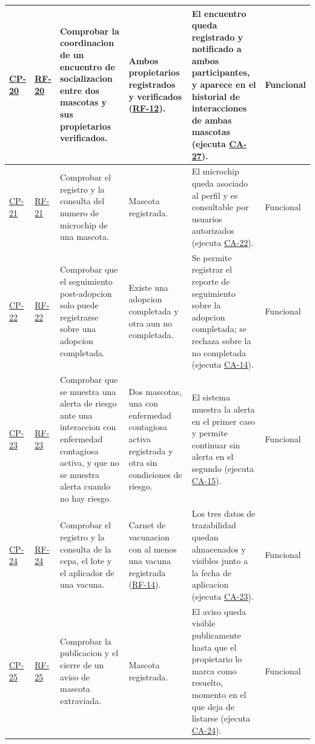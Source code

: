 \documentclass[journal,onecolumn]{IEEEtran}
\begin{document}
\begin{landscape}
\begin{longtable}{@{}p{1.3cm} p{1.3cm} p{4.6cm} p{3.6cm} p{5.2cm} p{1.6cm}@{}}
			\hyperref[cp:20]{CP-20}\label{cp:20} & \hyperref[tab:RF-20]{RF-20} & Comprobar la coordinacion de un encuentro de socializacion entre dos mascotas y sus propietarios verificados. & Ambos propietarios registrados y verificados (\hyperref[tab:RF-12]{RF-12}). & El encuentro queda registrado y notificado a ambos participantes, y aparece en el historial de interacciones de ambas mascotas (ejecuta \hyperref[lst:ca27]{CA-27}). & Funcional \\ \midrule
			\hyperref[cp:21]{CP-21}\label{cp:21} & \hyperref[tab:RF-21]{RF-21} & Comprobar el registro y la consulta del numero de microchip de una mascota. & Mascota registrada. & El microchip queda asociado al perfil y es consultable por usuarios autorizados (ejecuta \hyperref[lst:ca22]{CA-22}). & Funcional \\ \midrule
			\hyperref[cp:22]{CP-22}\label{cp:22} & \hyperref[tab:RF-22]{RF-22} & Comprobar que el seguimiento post-adopcion solo puede registrarse sobre una adopcion completada. & Existe una adopcion completada y otra aun no completada. & Se permite registrar el reporte de seguimiento sobre la adopcion completada; se rechaza sobre la no completada (ejecuta \hyperref[lst:ca14]{CA-14}). & Funcional \\ \midrule
			\hyperref[cp:23]{CP-23}\label{cp:23} & \hyperref[tab:RF-23]{RF-23} & Comprobar que se muestra una alerta de riesgo ante una interaccion con enfermedad contagiosa activa, y que no se muestra alerta cuando no hay riesgo. & Dos mascotas, una con enfermedad contagiosa activa registrada y otra sin condiciones de riesgo. & El sistema muestra la alerta en el primer caso y permite continuar sin alerta en el segundo (ejecuta \hyperref[lst:ca15]{CA-15}). & Funcional \\ \midrule
			\hyperref[cp:24]{CP-24}\label{cp:24} & \hyperref[tab:RF-24]{RF-24} & Comprobar el registro y la consulta de la cepa, el lote y el aplicador de una vacuna. & Carnet de vacunacion con al menos una vacuna registrada (\hyperref[tab:RF-14]{RF-14}). & Los tres datos de trazabilidad quedan almacenados y visibles junto a la fecha de aplicacion (ejecuta \hyperref[lst:ca23]{CA-23}). & Funcional \\ \midrule
			\hyperref[cp:25]{CP-25}\label{cp:25} & \hyperref[tab:RF-25]{RF-25} & Comprobar la publicacion y el cierre de un aviso de mascota extraviada. & Mascota registrada. & El aviso queda visible publicamente hasta que el propietario lo marca como resuelto, momento en el que deja de listarse (ejecuta \hyperref[lst:ca24]{CA-24}). & Funcional \\ \midrule

\end{longtable}
\end{landscape}
\end{document}
